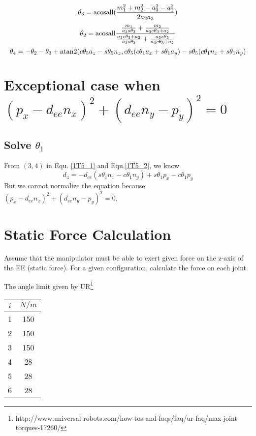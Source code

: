 \documentclass[utf8]{article}
\begin{document}
\begin{equation*}
\theta_3 = {\rm acosall}(\frac{m_1^2 + m_2^2 - a_3^2 - a_2^2}{2a_2a_3})
\end{equation*}
\begin{equation*}
\theta_2 = {\rm acosall}\frac{\frac{m_1}{a_3s\theta_3} +\frac{m_2}{a_3c\theta_3 +a_2}}{\frac{a_3c\theta_3+a_2}{a_3s\theta_3} + \frac{a_3s\theta_3}{a_3c\theta_3 + a_2}}
\end{equation*}
\begin{equation*}
\theta_4 = -\theta_2 - \theta_3 + {\rm atan2}(c\theta_5a_z - s\theta_5n_z, c\theta_5(c\theta_1a_x +s\theta_1a_y) - s\theta_5(c\theta_1n_x + s\theta_1n_y)
\end{equation*}

\section{Exceptional case when $(p_x - d_{ee}n_x)^2 + (d_{ee}n_y - p_y)^2 = 0$}
\subsection{Solve $\theta_1$}
From $(3, 4)$ in Equ. \ref{1T5_1} and Equ.\ref{1T5_2}, we know
$$d_4 = -d_{ee}(s\theta_1n_x - c\theta_1n_y) + s\theta_1p_x - c\theta_1p_y$$
But we cannot normalize the equation because $(p_x - d_{ee}n_x)^2 + (d_{ee}n_y - p_y)^2 = 0$. 



\section{Static Force Calculation}
Assume that the manipulator must be able to exert given force on the z-axis of the EE (static force). For a given configuration, calculate the force on each joint. 

The angle limit given by UR\footnote{http://www.universal-robots.com/how-tos-and-faqs/faq/ur-faq/max-joint-torques-17260/}
\begin{table}[h]
\centering
\begin{tabular}{|c|c|}
\hline
$i$ & $N/m$ \\
\hline
\hline
1 & 150 \\
\hline
2 & 150\\
\hline
3 & 150\\
\hline
4 & 28\\
\hline
5 & 28\\
\hline 
6 & 28\\
\hline
\end{tabular}
\end{table}
\end{document}
